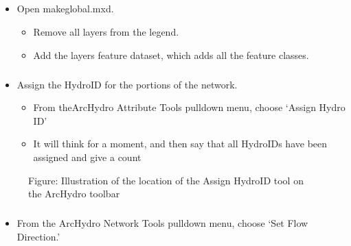 \documentclass[letterpaper,10pt,english]{sphinxmanual}
\begin{document}
\subparagraph{}
\label{\detokenize{ex_2:enabling-geometric-network}}\begin{itemize}
\item {} 
Open makeglobal.mxd.
\begin{itemize}
\item {} 
Remove all layers from the legend.

\item {} 
Add the layers feature dataset, which adds all the feature classes.

\end{itemize}

\end{itemize}


\subparagraph{}
\label{\detokenize{ex_2:assign-hydroid}}\begin{itemize}
\item {} 
Assign the HydroID for the portions of the network.
\begin{itemize}
\item {} 
From theArcHydro Attribute Tools pulldown menu, choose ‘Assign Hydro ID’

\item {} 
It will think for a moment, and then say that all HydroIDs have been assigned and give a count

\end{itemize}

\end{itemize}

\begin{figure}[htbp]
\centering
\capstart

\noindent{}
\caption{Figure: Illustration of the location of the Assign HydroID tool on the ArcHydro toolbar}\label{\detokenize{ex_2:id30}}\end{figure}


\subparagraph{}
\label{\detokenize{ex_2:set-flow-direction}}\begin{itemize}
\item {} 
From the ArcHydro Network Tools pulldown menu, choose ‘Set Flow Direction.’

\end{itemize}
\end{document}
